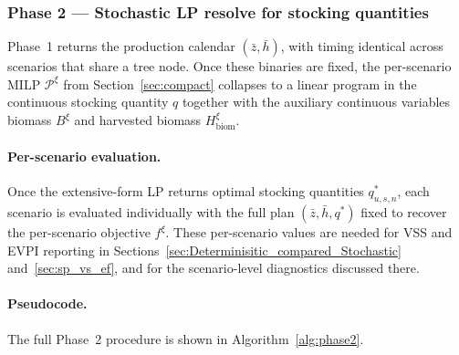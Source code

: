 \documentclass[12pt,a4paper]{article}
\begin{document}
\subsubsection{Phase 2 --- Stochastic LP resolve for stocking quantities}
\label{sec:lpresolve}

Phase~1 returns the production calendar $(\bar{z}, \bar{h})$, with timing identical across scenarios that share a tree node. Once these binaries are fixed, the per-scenario MILP $\mathcal{P}^\xi$ from Section~\ref{sec:compact} collapses to a linear program in the continuous stocking quantity $q$ together with the auxiliary continuous variables biomass $B^\xi$ and harvested biomass $H^\xi_{\mathrm{biom}}$.


\paragraph{Per-scenario evaluation.}
Once the extensive-form LP returns optimal stocking quantities
$q^*_{u,s,n}$, each scenario is evaluated individually with the full
plan $(\bar{z}, \bar{h}, q^*)$ fixed to recover the per-scenario
objective $f^\xi$. These per-scenario values are needed for VSS and
EVPI reporting in Sections~\ref{sec:Determinisitic_compared_Stochastic}
and~\ref{sec:sp_vs_ef}, and for the scenario-level diagnostics
discussed there.

\paragraph{Pseudocode.}
The full Phase~2 procedure is shown in Algorithm~\ref{alg:phase2}.
\end{document}
